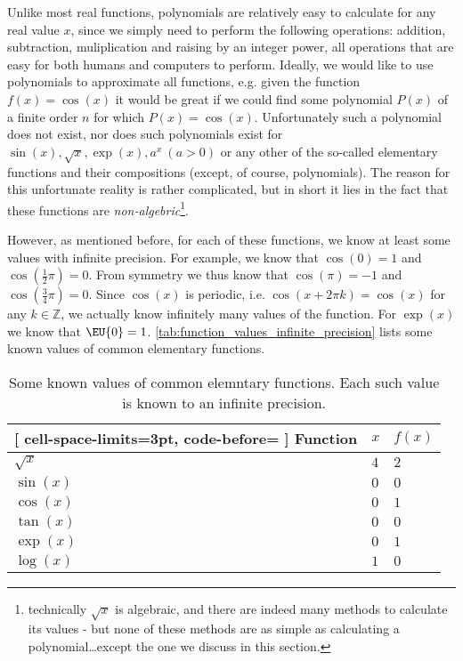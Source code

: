 Unlike most real functions, polynomials are relatively easy to calculate for any real value $x$, since we simply need to perform the following operations: addition, subtraction, muliplication and raising by an integer power, all operations that are easy for both humans and computers to perform. Ideally, we would like to use polynomials to approximate all functions, e.g. given the function $f(x) = \cos(x)$ it would be great if we could find some polynomial $P(x)$ of a finite order $n$ for which $P(x)=\cos(x)$. Unfortunately such a polynomial does not exist, nor does such polynomials exist for $\sin(x), \sqrt{x}, \exp(x), a^{x}\ \left(a>0\right)$ or any other of the so-called elementary functions and their compositions (except, of course, polynomials). The reason for this unfortunate reality is rather complicated, but in short it lies in the fact that these functions are \textit{non-algebric}\footnote{technically $\sqrt{x}$ is algebraic, and there are indeed many methods to calculate its values - but none of these methods are as simple as calculating a polynomial\dots except the one we discuss in this section.}.

However, as mentioned before, for each of these functions, we know at least some values with infinite precision. For example, we know that $\cos(0)=1$ and $\cos\left(\frac{1}{2}\pi\right)=0$. From symmetry we thus know that $\cos(\pi)=-1$ and $\cos\left(\frac{3}{4}\pi\right)=0$. Since $\cos(x)$ is periodic, i.e. $\cos\left(x+2\pi k\right)=\cos(x)$ for any $k\in\mathbb{Z}$, we actually know infinitely many values of the function. For $\exp(x)$ we know that $\EU{0}=1$. \autoref{tab:function_values_infinite_precision} lists some known values of common elementary functions.

\begin{table}[htpb]
	\centering
	\caption{Some known values of common elemntary functions. Each such value is known to an infinite precision.}
	\label{tab:function_values_infinite_precision}
	\begin{NiceTabular}{lll}[
			cell-space-limits=3pt, code-before= 
		]
		\toprule
		\RowStyle{\bfseries} Function & $x$ & $f(x)$\\
		\midrule
    $\sqrt{x}$ & $4$ & $2$\\
    $\sin(x)$ & $0$ & $0$\\
    $\cos(x)$ & $0$ & $1$\\
    $\tan(x)$ & $0$ & $0$\\
    $\exp(x)$ & $0$ & $1$\\
    $\log(x)$ & $1$ & $0$\\
		\bottomrule
	\end{NiceTabular}
\end{table}

